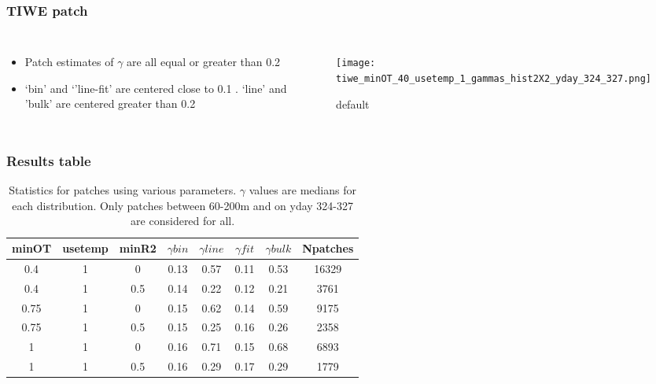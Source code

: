 \documentclass{beamer}
\begin{document}
\begin{frame}
 \frametitle{TIWE patch}

\begin{columns}
\begin{itemize}
\item Patch estimates of $\gamma$ are all equal or greater than 0.2
\item `bin' and `'line-fit' are centered close to 0.1 . `line' and 'bulk' are centered greater than 0.2
\end{itemize}

\begin{figure}[htbp]
\begin{center}
\texttt{[image: tiwe\_minOT\_40\_usetemp\_1\_gammas\_hist2X2\_yday\_324\_327.png]}
\caption{default}
\label{default}
\end{center}
\end{figure}

\end{columns}


\end{frame}





\begin{frame}
 \frametitle{Results table}


\begin{table}[htdp]
\caption{Statistics for patches using various parameters. $\gamma$ values are medians for each distribution. Only patches between 60-200m and on yday 324-327 are considered for all.}
\begin{center}
\begin{tabular}{|c|c|c|c|c|c|c|c|}
\hline
minOT & usetemp & minR2 & $\gamma bin$ & $\gamma line$ & $\gamma fit$ & $\gamma bulk$ & Npatches \\
\hline
0.4 & 1 & 0 & 0.13 & 0.57 & 0.11 & 0.53 & 16329 \\
\hline
0.4 & 1 & 0.5 & 0.14 & 0.22 & 0.12 & 0.21 & 3761 \\
\hline
0.75 & 1 & 0 & 0.15 & 0.62 & 0.14 & 0.59 & 9175 \\
\hline
0.75 & 1 & 0.5 & 0.15 & 0.25 & 0.16 & 0.26 & 2358 \\
\hline
1 & 1 & 0 & 0.16 & 0.71 & 0.15 & 0.68 & 6893 \\
\hline
1 & 1 & 0.5 & 0.16 & 0.29 & 0.17 & 0.29 & 1779 \\
\hline
\hline
\hline
\end{tabular}
\end{center}
\label{tab}
\end{table}%


\end{frame}
\end{document}

